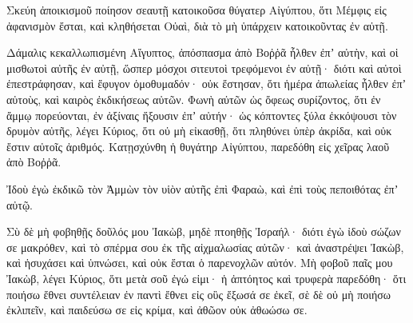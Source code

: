 {Σκεύη ἀποικισμοῦ ποίησον σεαυτῇ κατοικοῦσα θύγατερ Αἰγύπτου, ὅτι Μέμφις εἰς ἀφανισμὸν ἔσται, καὶ κληθήσεται Οὐαὶ, διὰ τὸ μὴ ὑπάρχειν κατοικοῦντας ἐν αὐτῇ.
\par }{\PP {}Δάμαλις κεκαλλωπισμένη Αἴγυπτος, ἀπόσπασμα ἀπὸ Βοῤῥᾶ ἦλθεν ἐπʼ αὐτὴν,
καὶ οἱ μισθωτοὶ αὐτῆς ἐν αὐτῇ, ὥσπερ μόσχοι σιτευτοὶ τρεφόμενοι ἐν αὐτῇ· διότι καὶ αὐτοὶ ἐπεστράφησαν, καὶ ἔφυγον ὁμοθυμαδόν· οὐκ ἔστησαν, ὅτι ἡμέρα ἀπωλείας ἦλθεν ἐπʼ αὐτοὺς, καὶ καιρὸς ἐκδικήσεως αὐτῶν.
Φωνὴ αὐτῶν ὡς ὄφεως συρίζοντος, ὅτι ἐν ἄμμῳ πορεύονται, ἐν ἀξίναις ἥξουσιν ἐπʼ αὐτήν·
ὡς κόπτοντες ξύλα ἐκκόψουσι τὸν δρυμὸν αὐτῆς, λέγει Κύριος, ὅτι οὐ μὴ εἰκασθῇ, ὅτι πληθύνει ὑπὲρ ἀκρίδα, καὶ οὐκ ἔστιν αὐτοῖς ἀριθμός.
Κατῃσχύνθη ἡ θυγάτηρ Αἰγύπτου, παρεδόθη εἰς χεῖρας λαοῦ ἀπὸ Βοῤῥᾶ.
\par }{\PP {}Ἰδοὺ ἐγὼ ἐκδικῶ τὸν Ἀμμὼν τὸν υἱὸν αὐτῆς ἐπὶ Φαραὼ, καὶ ἐπὶ τοὺς πεποιθότας ἐπʼ αὐτῷ.
\par }{\PP {}Σὺ δὲ μὴ φοβηθῇς δοῦλός μου Ἰακὼβ, μηδὲ πτοηθῇς Ἰσραήλ· διότι ἐγὼ ἰδοὺ σώζων σε μακρόθεν, καὶ τὸ σπέρμα σου ἐκ τῆς αἰχμαλωσίας αὐτῶν· καὶ ἀναστρέψει Ἰακὼβ, καὶ ἡσυχάσει καὶ ὑπνώσει, καὶ οὐκ ἔσται ὁ παρενοχλῶν αὐτόν.
Μὴ φοβοῦ παῖς μου Ἰακὼβ, λέγει Κύριος, ὅτι μετὰ σοῦ ἐγώ εἰμι· ἡ ἀπτόητος καὶ τρυφερὰ παρεδόθη· ὅτι ποιήσω ἔθνει συντέλειαν ἐν παντὶ ἔθνει εἰς οὓς ἔξωσά σε ἐκεῖ, σὲ δὲ οὐ μὴ ποιήσω ἐκλιπεῖν, καὶ παιδεύσω σε εἰς κρίμα, καὶ ἀθῶον οὐκ ἀθωώσω σε.

}
